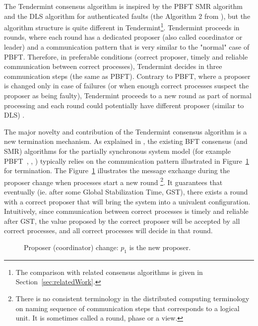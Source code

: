 The Tendermint consensus algorithm is inspired by the PBFT SMR
algorithm~\cite{CL99:osdi} and the DLS algorithm for authenticated faults (the
Algorithm 2 from \cite{DLS88:jacm}), but the algorithm structure is quite
different in Tendermint\footnote{The comparison with related consensus
algorithms is given in Section~\ref{sec:relatedWork}.}. Tendermint proceeds in
rounds, where each round has a dedicated proposer (also called coordinator or
leader) and a communication pattern that is very similar to the "normal" case
of PBFT. Therefore, in preferable conditions (correct proposer, timely and
reliable communication between correct processes), Tendermint decides in three
communication steps (the same as PBFT). Contrary to PBFT, where a proposer is
changed only in case of failures (or when enough correct processes suspect the
proposer as being faulty), Tendermint proceeds to a new round as part of normal
processing and each round could potentially have different proposer (similar to
DLS) . 

The major novelty and contribution of the Tendermint consensus algorithm is a
new termination mechanism. As explained in \cite{MHS09:opodis, RMS10:dsn}, the
existing BFT consensus (and SMR) algorithms for the partially synchronous
system model (for example PBFT~\cite{CL99:osdi}, \cite{DLS88:jacm},
\cite{MA06:tdsc}) typically relies on the communication pattern illustrated in
Figure~\ref{ch3:fig:coordinator-change} for termination. The
Figure~\ref{ch3:fig:coordinator-change} illustrates the message exchange during
the proposer change when processes start a new round \footnote{There is no
consistent terminology in the distributed computing terminology on naming
sequence of communication steps that corresponds to a logical unit. It is
sometimes called a round, phase or a view.}. It guarantees that eventually (ie.
after some Global Stabilization Time, GST), there exists a round with a correct
proposer that will bring the system into a univalent configuration.
Intuitively, since communication between correct processes is timely and
reliable after GST, the value proposed by the correct proposer will be accepted
by all correct processes, and all correct processes will decide in that round.   

\begin{figure}[tbh!] \def\rdstretch{5} \def\ystretch{3} \centering
    \begin{rounddiag}{4}{2}  
          
         
       \end{rounddiag}
\vspace{-5mm} \caption{\boldmath Proposer (coordinator) change: $p_1$ is the
new proposer.} \label{ch3:fig:coordinator-change} \end{figure}  

